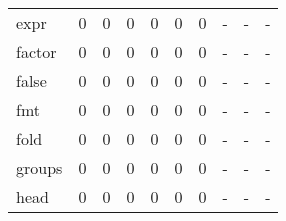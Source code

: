\begin{longtable}{lp{2.0cm}p{2.0cm}p{2.0cm}p{2.0cm}p{2.0cm}p{2.0cm}p{2.0cm}p{2.0cm}p{2.0cm}}
expr      &                      0 &                                             0 &                                            0 &                                           0 &                                            0 &                                          0 &                                    - &                                      - &                                    - \\
factor    &                      0 &                                             0 &                                            0 &                                           0 &                                            0 &                                          0 &                                    - &                                      - &                                    - \\
false     &                      0 &                                             0 &                                            0 &                                           0 &                                            0 &                                          0 &                                    - &                                      - &                                    - \\
fmt       &                      0 &                                             0 &                                            0 &                                           0 &                                            0 &                                          0 &                                    - &                                      - &                                    - \\
fold      &                      0 &                                             0 &                                            0 &                                           0 &                                            0 &                                          0 &                                    - &                                      - &                                    - \\
groups    &                      0 &                                             0 &                                            0 &                                           0 &                                            0 &                                          0 &                                    - &                                      - &                                    - \\
head      &                      0 &                                             0 &                                            0 &                                           0 &                                            0 &                                          0 &                                    - &                                      - &                                    - \\

\end{longtable}
